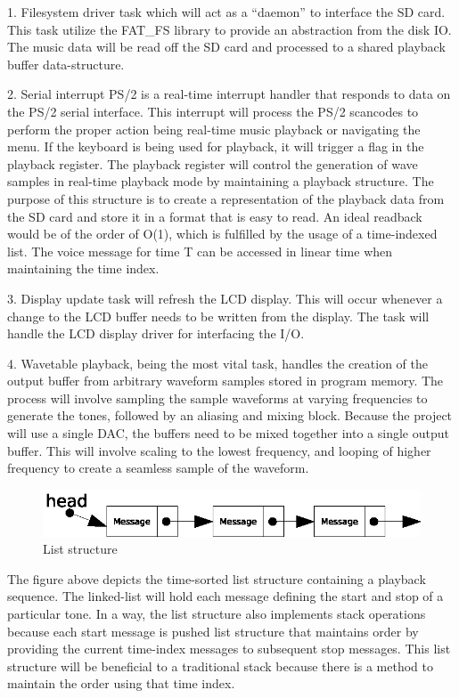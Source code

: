 \documentclass[bibtotocnumbered,abstract=on,paper=a4,fontsize=12pt,parskip=on,halfparskip=on]{scrartcl}		%
\begin{document}
        1. Filesystem driver task which will act as a “daemon” to interface the SD card. This task utilize the FAT\_FS \cite{website:fatfsnotes} library to provide an abstraction from the disk IO. The music data will be read off the SD card and processed to a shared playback buffer data-structure.

        2. Serial interrupt PS/2 is a real-time interrupt handler that responds to data on the PS/2 serial interface. This interrupt will process the PS/2 scancodes to perform the proper action being real-time music playback or navigating the menu. If the keyboard is being used for playback, it will trigger a flag in the playback register. The playback register will control the generation of wave samples in real-time playback mode by maintaining a playback structure. The purpose of this structure is to create a representation of the playback data from the SD card and store it in a format that is easy to read. An ideal readback would be of the order of O(1), which is fulfilled by the usage of a time-indexed list. The voice message for time T can be accessed in linear time when maintaining the time index.

        3. Display update task will refresh the LCD display. This will occur whenever a change to the LCD buffer needs to be written from the display. The task will handle the LCD display driver for interfacing the I/O.

        4. Wavetable playback, being the most vital task, handles the creation of the output buffer from arbitrary waveform samples stored in program memory. The process will involve sampling the sample waveforms at varying frequencies to generate the tones, followed by an aliasing and mixing block. Because the project will use a single DAC, the buffers need to be mixed together into a single output buffer. This will involve scaling to the lowest frequency, and looping of higher frequency to create a seamless sample of the waveform.

  \begin{figure}[h!]
    \centering
      \includegraphics[]{img/fig_liststruct}
      \caption{List structure}
  \end{figure}

  The figure above depicts the time-sorted list structure containing a playback sequence. The linked-list will hold each message defining the start and stop of a particular tone. In a way, the list structure also implements stack operations because each start message is pushed list structure that maintains order by providing the current time-index messages to subsequent stop messages. This list structure will be beneficial to a traditional stack because there is a method to maintain the order using that time index.
\end{document}
